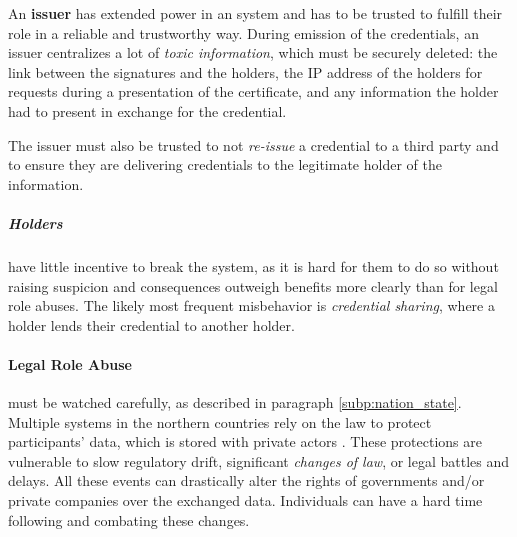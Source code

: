 An \textbf{issuer} has extended power in an \eid system and has to be trusted 
to fulfill their role in a reliable and trustworthy way.
During emission of the credentials, an issuer centralizes a lot of \emph{toxic information}, which must be securely deleted: the link between the signatures and the holders,
the IP address of the holders for requests during a presentation of the certificate, and any information the holder had to present in exchange for the credential.

The issuer must also be trusted to
not \emph{re-issue} a credential to a third party and to ensure they are delivering credentials to the legitimate holder of the information.

\subparagraph{Holders} have little incentive to break the system, as it is hard for them to do so without raising suspicion and consequences outweigh benefits
more clearly than for legal role abuses.
The likely most frequent misbehavior is \emph{credential sharing}, where a holder lends their credential to another holder.

\paragraph{Legal Role Abuse} must be watched carefully, as described in paragraph \ref{subp:nation_state}.
Multiple \eid systems in the northern countries rely on the law to protect participants'
data, which is stored with private actors \cite{BankID25}.
These protections are vulnerable to slow regulatory drift, significant \emph{changes of law}, or legal battles and delays.
All these events can drastically alter the rights of governments and/or private companies over the exchanged data.
Individuals can have a hard time following and combating these changes.


